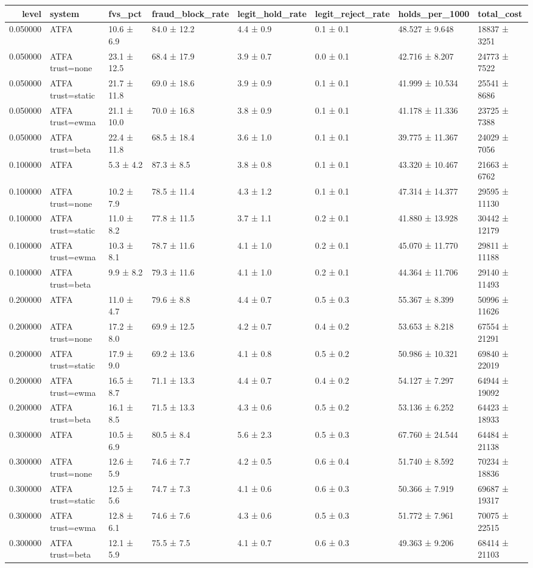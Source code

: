 \begin{tabular}{rlllllll}
\toprule
level & system & fvs\_pct & fraud\_block\_rate & legit\_hold\_rate & legit\_reject\_rate & holds\_per\_1000 & total\_cost \\
\midrule
0.050000 & ATFA & 10.6 ± 6.9 & 84.0 ± 12.2 & 4.4 ± 0.9 & 0.1 ± 0.1 & 48.527 ± 9.648 & 18837 ± 3251 \\
0.050000 & ATFA trust=none & 23.1 ± 12.5 & 68.4 ± 17.9 & 3.9 ± 0.7 & 0.0 ± 0.1 & 42.716 ± 8.207 & 24773 ± 7522 \\
0.050000 & ATFA trust=static & 21.7 ± 11.8 & 69.0 ± 18.6 & 3.9 ± 0.9 & 0.1 ± 0.1 & 41.999 ± 10.534 & 25541 ± 8686 \\
0.050000 & ATFA trust=ewma & 21.1 ± 10.0 & 70.0 ± 16.8 & 3.8 ± 0.9 & 0.1 ± 0.1 & 41.178 ± 11.336 & 23725 ± 7388 \\
0.050000 & ATFA trust=beta & 22.4 ± 11.8 & 68.5 ± 18.4 & 3.6 ± 1.0 & 0.1 ± 0.1 & 39.775 ± 11.367 & 24029 ± 7056 \\
0.100000 & ATFA & 5.3 ± 4.2 & 87.3 ± 8.5 & 3.8 ± 0.8 & 0.1 ± 0.1 & 43.320 ± 10.467 & 21663 ± 6762 \\
0.100000 & ATFA trust=none & 10.2 ± 7.9 & 78.5 ± 11.4 & 4.3 ± 1.2 & 0.1 ± 0.1 & 47.314 ± 14.377 & 29595 ± 11130 \\
0.100000 & ATFA trust=static & 11.0 ± 8.2 & 77.8 ± 11.5 & 3.7 ± 1.1 & 0.2 ± 0.1 & 41.880 ± 13.928 & 30442 ± 12179 \\
0.100000 & ATFA trust=ewma & 10.3 ± 8.1 & 78.7 ± 11.6 & 4.1 ± 1.0 & 0.2 ± 0.1 & 45.070 ± 11.770 & 29811 ± 11188 \\
0.100000 & ATFA trust=beta & 9.9 ± 8.2 & 79.3 ± 11.6 & 4.1 ± 1.0 & 0.2 ± 0.1 & 44.364 ± 11.706 & 29140 ± 11493 \\
0.200000 & ATFA & 11.0 ± 4.7 & 79.6 ± 8.8 & 4.4 ± 0.7 & 0.5 ± 0.3 & 55.367 ± 8.399 & 50996 ± 11626 \\
0.200000 & ATFA trust=none & 17.2 ± 8.0 & 69.9 ± 12.5 & 4.2 ± 0.7 & 0.4 ± 0.2 & 53.653 ± 8.218 & 67554 ± 21291 \\
0.200000 & ATFA trust=static & 17.9 ± 9.0 & 69.2 ± 13.6 & 4.1 ± 0.8 & 0.5 ± 0.2 & 50.986 ± 10.321 & 69840 ± 22019 \\
0.200000 & ATFA trust=ewma & 16.5 ± 8.7 & 71.1 ± 13.3 & 4.4 ± 0.7 & 0.4 ± 0.2 & 54.127 ± 7.297 & 64944 ± 19092 \\
0.200000 & ATFA trust=beta & 16.1 ± 8.5 & 71.5 ± 13.3 & 4.3 ± 0.6 & 0.5 ± 0.2 & 53.136 ± 6.252 & 64423 ± 18933 \\
0.300000 & ATFA & 10.5 ± 6.9 & 80.5 ± 8.4 & 5.6 ± 2.3 & 0.5 ± 0.3 & 67.760 ± 24.544 & 64484 ± 21138 \\
0.300000 & ATFA trust=none & 12.6 ± 5.9 & 74.6 ± 7.7 & 4.2 ± 0.5 & 0.6 ± 0.4 & 51.740 ± 8.592 & 70234 ± 18836 \\
0.300000 & ATFA trust=static & 12.5 ± 5.6 & 74.7 ± 7.3 & 4.1 ± 0.6 & 0.6 ± 0.3 & 50.366 ± 7.919 & 69687 ± 19317 \\
0.300000 & ATFA trust=ewma & 12.8 ± 6.1 & 74.6 ± 7.6 & 4.3 ± 0.6 & 0.5 ± 0.3 & 51.772 ± 7.961 & 70075 ± 22515 \\
0.300000 & ATFA trust=beta & 12.1 ± 5.9 & 75.5 ± 7.5 & 4.1 ± 0.7 & 0.6 ± 0.3 & 49.363 ± 9.206 & 68414 ± 21103 \\
\bottomrule
\end{tabular}
